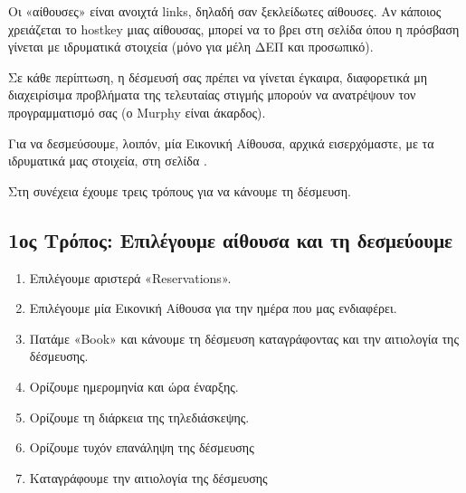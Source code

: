 \documentclass[letterpaper,10pt,greek]{sphinxhowto}
\begin{document}
\sphinxAtStartPar
Οι «αίθουσες» είναι ανοιχτά links, δηλαδή σαν ξεκλείδωτες αίθουσες.
Αν κάποιος χρειάζεται το hostkey μιας αίθουσας, μπορεί να το βρει στη
σελίδα  όπου η πρόσβαση γίνεται
με ιδρυματικά στοιχεία (μόνο για μέλη ΔΕΠ και προσωπικό).

\sphinxAtStartPar
Σε κάθε περίπτωση, η δέσμευσή σας πρέπει να γίνεται έγκαιρα, διαφορετικά  μη διαχειρίσιμα
προβλήματα της τελευταίας στιγμής μπορούν να ανατρέψουν τον προγραμματισμό σας (ο Murphy είναι άκαρδος).

\sphinxAtStartPar
Για να δεσμεύσουμε, λοιπόν, μία Εικονική Αίθουσα, αρχικά εισερχόμαστε, με τα ιδρυματικά μας στοιχεία,
στη σελίδα .

\sphinxAtStartPar
Στη συνέχεια έχουμε τρεις τρόπους για να κάνουμε τη δέσμευση.


\subsection{1ος Τρόπος: Επιλέγουμε αίθουσα και τη δεσμεύουμε}
\label{\detokenize{HowToZoom:id1}}\begin{enumerate}
%
\item {} 
\sphinxAtStartPar
Επιλέγουμε αριστερά «Reservations».

\item {} 
\sphinxAtStartPar
Επιλέγουμε μία Εικονική Αίθουσα για την ημέρα που μας ενδιαφέρει.

\item {} 
\sphinxAtStartPar
Πατάμε «Book» και κάνουμε τη δέσμευση καταγράφοντας και την αιτιολογία της δέσμευσης.

\item {} 
\sphinxAtStartPar
Ορίζουμε ημερομηνία και ώρα έναρξης.

\item {} 
\sphinxAtStartPar
Ορίζουμε τη διάρκεια της τηλεδιάσκεψης.

\item {} 
\sphinxAtStartPar
Ορίζουμε τυχόν επανάληψη της δέσμευσης

\item {} 
\sphinxAtStartPar
Καταγράφουμε την αιτιολογία της δέσμευσης

\end{enumerate}
\end{document}
